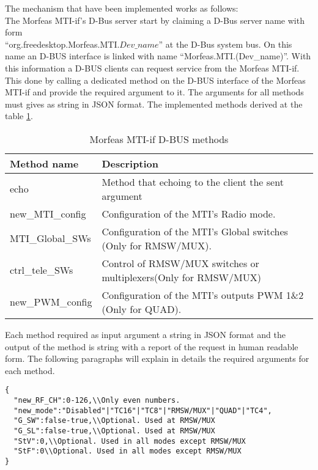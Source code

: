 The mechanism that have been implemented works as follows:\\
The Morfeas MTI-if's D-Bus server start by claiming a D-Bus server name with form \\``org.freedesktop.Morfeas.MTI.\(Dev\_name\)'' at the D-Bus system bus.
On this name an D-BUS interface is linked with name ``Morfeas.MTI.(Dev\_name)''. With this information a D-BUS clients can request service from the Morfeas MTI-if.
This done by calling a dedicated method on the D-BUS interface of the Morfeas MTI-if and provide the required argument to it.
The arguments for all methods must gives as string in JSON format.
The implemented methods derived at the table \ref{tab:MTI-if_D-BUS_methods}.
\begin{table}[h!]
  \begin{center}
    \caption{Morfeas MTI-if D-BUS methods}
    \label{tab:MTI-if_D-BUS_methods}
    \begin{tabular}{|l|l|}
      \hline
	  \textbf{Method name} & \textbf{Description}\\
      \hline
	  echo & Method that echoing to the client the sent argument\\
      new\_MTI\_config & Configuration of the MTI's Radio mode.\\
      MTI\_Global\_SWs & Configuration of the MTI's Global switches (Only for RMSW/MUX).\\
	  ctrl\_tele\_SWs & Control of RMSW/MUX switches or multiplexers(Only for RMSW/MUX)\\
      new\_PWM\_config & Configuration of the MTI's outputs PWM 1\&2 (Only for QUAD).\\
	  \hline
    \end{tabular}
  \end{center}
\end{table}

Each method required as input argument a string in JSON format and the output of the method is string with a report of the request in human readable form.
The following paragraphs will explain in details the required arguments for each method.

\begin{lstlisting}[frame=single,caption=Argument for new\_MTI\_config()]
{
  "new_RF_CH":0-126,\\Only even numbers.
  "new_mode":"Disabled"|"TC16"|"TC8"|"RMSW/MUX"|"QUAD"|"TC4",
  "G_SW":false-true,\\Optional. Used at RMSW/MUX
  "G_SL":false-true,\\Optional. Used at RMSW/MUX
  "StV":0,\\Optional. Used in all modes except RMSW/MUX
  "StF":0\\Optional. Used in all modes except RMSW/MUX
}
\end{lstlisting}

